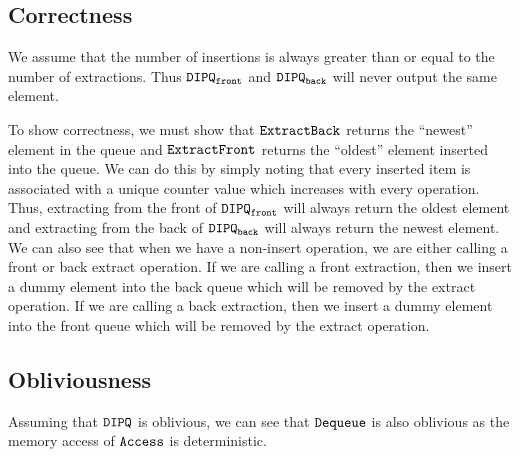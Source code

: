 \subsection{Correctness}
We assume that the number of insertions is always greater than or equal to the number of extractions.
Thus $\texttt{DIPQ}_{\texttt{front}}$ and $\texttt{DIPQ}_{\texttt{back}}$ will never output the same element.

To show correctness, we must show that $\texttt{ExtractBack}$ returns the ``newest'' element in the queue and $\texttt{ExtractFront}$ returns the ``oldest'' element inserted into the queue.
We can do this by simply noting that every inserted item is associated with a unique counter value which increases with every operation.
Thus, extracting from the front of $\texttt{DIPQ}_{\texttt{front}}$ will always return the oldest element and extracting from the back of $\texttt{DIPQ}_{\texttt{back}}$ will always return the newest element.
We can also see that when we have a non-insert operation, we are either calling a front or back extract operation.
If we are calling a front extraction, then we insert a dummy element into the back queue which will be removed by the extract operation.
If we are calling a back extraction, then we insert a dummy element into the front queue which will be removed by the extract operation.

\subsection{Obliviousness}
Assuming that $\texttt{DIPQ}$ is oblivious, we can see that $\texttt{Dequeue}$ is also oblivious as the memory access of $\texttt{Access}$ is deterministic.



